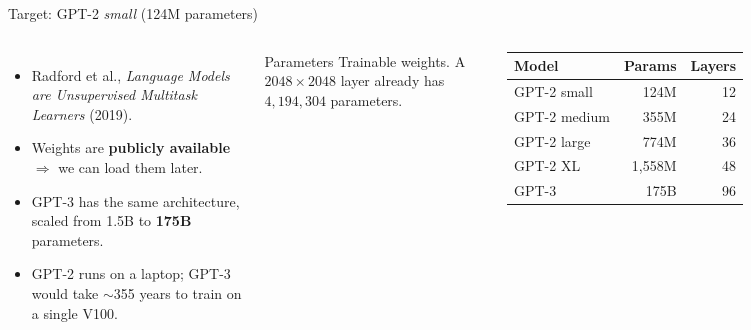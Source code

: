 \documentclass[aspectratio=169]{beamer}
\begin{document}
	\begin{frame}{Target: GPT-2 \emph{small} (124M parameters)}
		\begin{columns}[T]
			\small
			\begin{itemize}
				\item Radford et al., \emph{Language Models are Unsupervised Multitask Learners} (2019).
				\item Weights are \textbf{publicly available} $\Rightarrow$ we can load them later.
				\item GPT-3 has the same architecture, scaled from 1.5B to \textbf{175B} parameters.
				\item GPT-2 runs on a laptop; GPT-3 would take $\sim$355 years to train on a single V100.
			\end{itemize}
			\vspace{0.2cm}
			\begin{alertblock}{Parameters}
				\footnotesize Trainable weights. A $2048\times2048$ layer already has $4{,}194{,}304$ parameters.
			\end{alertblock}
			\centering
			\footnotesize
			\begin{tabular}{lrr}
				\toprule
				\textbf{Model} & \textbf{Params} & \textbf{Layers} \\
				\midrule
				GPT-2 small  & 124M   & 12 \\
				GPT-2 medium & 355M   & 24 \\
				GPT-2 large  & 774M   & 36 \\
				GPT-2 XL     & 1{,}558M & 48 \\
				\midrule
				GPT-3        & 175B   & 96 \\
				\bottomrule
			\end{tabular}
		\end{columns}
	\end{frame}
	
	
	
\end{document}
